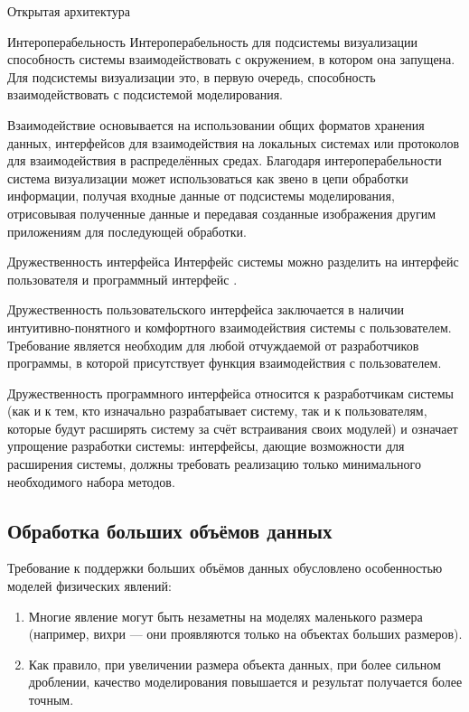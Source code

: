 \documentclass[a4paper,12pt]{extarticle}
\begin{document}
\begin{subsection}{Открытая архитектура}
    \begin{subsubsection}{Интероперабельность}
        Интероперабельность для подсистемы визуализации способность системы взаимодействовать с окружением, в котором она запущена. Для подсистемы визуализации это, в первую очередь, способность взаимодействовать с подсистемой моделирования.
        
        Взаимодействие основывается на использовании общих форматов хранения данных, интерфейсов для взаимодействия на локальных системах или протоколов для взаимодействия в распределённых средах. Благодаря интероперабельности система визуализации может использоваться как звено в цепи обработки информации, получая входные данные от подсистемы моделирования, отрисовывая полученные данные и передавая созданные изображения другим приложениям для последующей обработки.
    \end{subsubsection}
        
    \begin{subsubsection}{Дружественность интерфейса}
        Интерфейс системы можно разделить на интерфейс пользователя и программный интерфейс \cite{ieee}.
        
        Дружественность пользовательского интерфейса заключается в наличии интуитивно-понятного и комфортного взаимодействия системы с пользователем. Требование является необходим для любой отчуждаемой от разработчиков программы, в которой присутствует функция взаимодействия с пользователем.
        
        Дружественность программного интерфейса относится к разработчикам системы (как и к тем, кто изначально разрабатывает систему, так и к пользователям, которые будут расширять систему за счёт встраивания своих модулей) и означает упрощение разработки системы: интерфейсы, дающие возможности для расширения системы, должны требовать реализацию только минимального необходимого набора методов.
    \end{subsubsection}

\end{subsection}

\subsection{Обработка больших объёмов данных}

Требование к поддержки больших объёмов данных обусловлено особенностью моделей физических явлений:
\begin{enumerate}
    \item Многие явление могут быть незаметны на моделях маленького размера (например, вихри --- они проявляются только на объектах больших размеров).
    
    \item Как правило, при увеличении размера объекта данных, при более сильном дроблении, качество моделирования повышается и результат получается более точным.
\end{enumerate}
\end{document}
